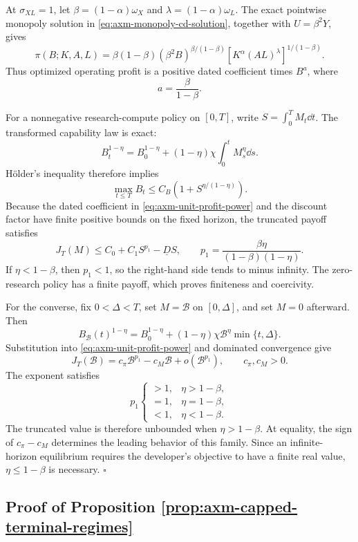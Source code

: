 At \(\sigma_{XL}=1\), let
\(\beta=(1-\alpha)\omega_X\) and
\(\lambda=(1-\alpha)\omega_L\). The exact pointwise monopoly solution in
\eqref{eq:axm-monopoly-cd-solution}, together with
\(U=\beta^2Y\), gives
\begin{equation}
 \pi(B;K,A,L)
 =\beta(1-\beta)
 (\beta^2B)^{\beta/(1-\beta)}
 \left[K^\alpha(AL)^\lambda\right]^{1/(1-\beta)}.
 \label{eq:axm-unit-profit-power}
\end{equation}
Thus optimized operating profit is a positive dated coefficient times
\(B^a\), where
\[
 a=\frac{\beta}{1-\beta}.
\]

For a nonnegative research-compute policy on \([0,T]\), write
\(S=\int_0^TM_t\dd t\). The transformed capability law is exact:
\[
 B_t^{1-\eta}
 =B_0^{1-\eta}+(1-\eta)\chi\int_0^tM_s^\eta\dd s.
\]
H\"older's inequality therefore implies
\[
 \max_{t\leq T}B_t
 \leq C_B\left(1+S^{\eta/(1-\eta)}\right).
\]
Because the dated coefficient in \eqref{eq:axm-unit-profit-power} and the
discount factor have finite positive bounds on the fixed horizon, the truncated
payoff satisfies
\begin{equation}
 J_T(M)\leq C_0+C_1S^{p_1}-\underline D S,
 \qquad
 p_1=\frac{\beta\eta}{(1-\beta)(1-\eta)}.
 \label{eq:axm-unit-research-payoff-bound}
\end{equation}
If \(\eta<1-\beta\), then \(p_1<1\), so the right-hand side tends to minus
infinity. The zero-research policy has a finite payoff, which proves finiteness
and coercivity.

For the converse, fix \(0<\Delta<T\), set
\(M=\mathcal B\) on \([0,\Delta]\), and set \(M=0\) afterward. Then
\[
 B_{\mathcal B}(t)^{1-\eta}
 =B_0^{1-\eta}+(1-\eta)\chi\mathcal B^\eta
 \min\{t,\Delta\}.
\]
Substitution into \eqref{eq:axm-unit-profit-power} and dominated convergence
give
\[
 J_T(\mathcal B)
 =c_\pi\mathcal B^{p_1}-c_M\mathcal B
 +o(\mathcal B^{p_1}),
 \qquad c_\pi,c_M>0.
\]
The exponent satisfies
\[
 p_1
 \begin{cases}
  >1,&\eta>1-\beta,\\
  =1,&\eta=1-\beta,\\
  <1,&\eta<1-\beta.
 \end{cases}
\]
The truncated value is therefore unbounded when \(\eta>1-\beta\). At
equality, the sign of \(c_\pi-c_M\) determines the leading behavior of this
family. Since an infinite-horizon equilibrium requires the developer's
objective to have a finite real value, \(\eta\leq1-\beta\) is necessary.
\(\square\)

\subsection{Proof of Proposition \ref{prop:axm-capped-terminal-regimes}}

